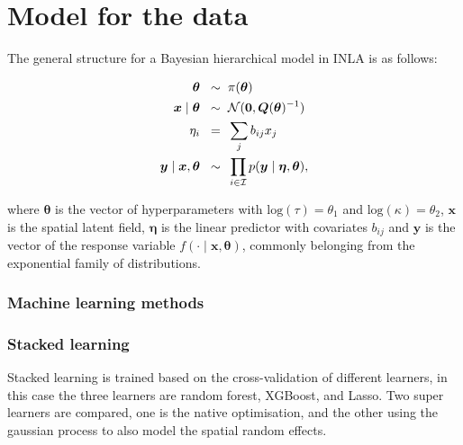 \documentclass{article}
\begin{document}
\section{Model for the data}

The general structure for a Bayesian hierarchical model in INLA is as follows:


\begin{align}
\boldsymbol{\theta} \hspace{2mm} \sim & \hspace{2mm} \pi(\boldsymbol{\theta}) \label{eqn:eq5}\\
\boldsymbol{x} \mid \boldsymbol{\theta} \hspace{2mm} \sim & \hspace{2mm} \mathcal{N}(\boldsymbol{0}, \boldsymbol{Q}(\boldsymbol{\theta})^{-1}) \label{eqn:eq6}\\
\eta_{i} \hspace{2mm} = & \hspace{2mm} \sum_{j}b_{ij}x_{j}\label{eqn:eq7}\\
\boldsymbol{y} \mid \boldsymbol{x}, \boldsymbol{\theta} \hspace{2mm} \sim & \hspace{2mm} \prod_{i \in \mathcal{I}}p(\boldsymbol{y} \mid \boldsymbol{\eta}, \boldsymbol{\theta}) \label{eqn:eq8},
\end{align}

where $\boldsymbol{\theta}$ is the vector of hyperparameters with $\text{log}(\tau) = \theta_{1}$ and $\text{log}(\kappa) = \theta_{2}$,  $\boldsymbol{x}$ is the spatial latent field, $\boldsymbol{\eta}$ is the linear predictor with covariates $b_{ij}$ and $\boldsymbol{y}$ is the vector of the response variable $f(\cdot \mid \boldsymbol{x}, \boldsymbol{\theta})$, commonly belonging from the exponential family of distributions. 
\vspace{0.2cm}



\subsubsection{Machine learning methods}

\subsubsection{Stacked learning}
Stacked learning is trained based on the cross-validation of different learners, in this case the three learners are random forest, XGBoost, and Lasso. Two super learners are compared, one is the native optimisation, and the other using the gaussian process to also model the spatial random effects. 
\end{document}
